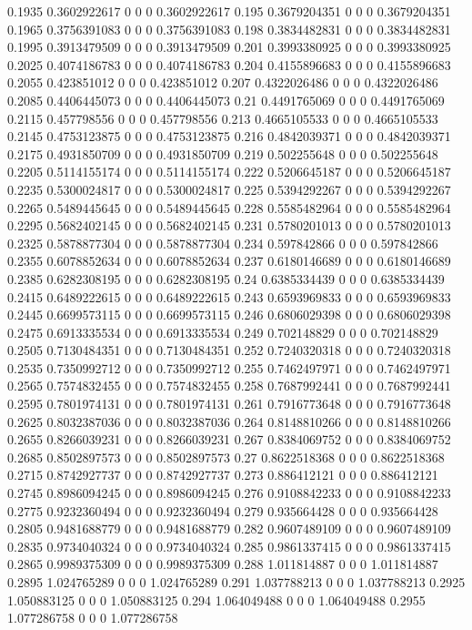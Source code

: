 {0.1935 0.3602922617 0 0 0 0.3602922617
0.195 0.3679204351 0 0 0 0.3679204351
0.1965 0.3756391083 0 0 0 0.3756391083
0.198 0.3834482831 0 0 0 0.3834482831
0.1995 0.3913479509 0 0 0 0.3913479509
0.201 0.3993380925 0 0 0 0.3993380925
0.2025 0.4074186783 0 0 0 0.4074186783
0.204 0.4155896683 0 0 0 0.4155896683
0.2055 0.423851012 0 0 0 0.423851012
0.207 0.4322026486 0 0 0 0.4322026486
0.2085 0.4406445073 0 0 0 0.4406445073
0.21 0.4491765069 0 0 0 0.4491765069
0.2115 0.457798556 0 0 0 0.457798556
0.213 0.4665105533 0 0 0 0.4665105533
0.2145 0.4753123875 0 0 0 0.4753123875
0.216 0.4842039371 0 0 0 0.4842039371
0.2175 0.4931850709 0 0 0 0.4931850709
0.219 0.502255648 0 0 0 0.502255648
0.2205 0.5114155174 0 0 0 0.5114155174
0.222 0.5206645187 0 0 0 0.5206645187
0.2235 0.5300024817 0 0 0 0.5300024817
0.225 0.5394292267 0 0 0 0.5394292267
0.2265 0.5489445645 0 0 0 0.5489445645
0.228 0.5585482964 0 0 0 0.5585482964
0.2295 0.5682402145 0 0 0 0.5682402145
0.231 0.5780201013 0 0 0 0.5780201013
0.2325 0.5878877304 0 0 0 0.5878877304
0.234 0.597842866 0 0 0 0.597842866
0.2355 0.6078852634 0 0 0 0.6078852634
0.237 0.6180146689 0 0 0 0.6180146689
0.2385 0.6282308195 0 0 0 0.6282308195
0.24 0.6385334439 0 0 0 0.6385334439
0.2415 0.6489222615 0 0 0 0.6489222615
0.243 0.6593969833 0 0 0 0.6593969833
0.2445 0.6699573115 0 0 0 0.6699573115
0.246 0.6806029398 0 0 0 0.6806029398
0.2475 0.6913335534 0 0 0 0.6913335534
0.249 0.702148829 0 0 0 0.702148829
0.2505 0.7130484351 0 0 0 0.7130484351
0.252 0.7240320318 0 0 0 0.7240320318
0.2535 0.7350992712 0 0 0 0.7350992712
0.255 0.7462497971 0 0 0 0.7462497971
0.2565 0.7574832455 0 0 0 0.7574832455
0.258 0.7687992441 0 0 0 0.7687992441
0.2595 0.7801974131 0 0 0 0.7801974131
0.261 0.7916773648 0 0 0 0.7916773648
0.2625 0.8032387036 0 0 0 0.8032387036
0.264 0.8148810266 0 0 0 0.8148810266
0.2655 0.8266039231 0 0 0 0.8266039231
0.267 0.8384069752 0 0 0 0.8384069752
0.2685 0.8502897573 0 0 0 0.8502897573
0.27 0.8622518368 0 0 0 0.8622518368
0.2715 0.8742927737 0 0 0 0.8742927737
0.273 0.886412121 0 0 0 0.886412121
0.2745 0.8986094245 0 0 0 0.8986094245
0.276 0.9108842233 0 0 0 0.9108842233
0.2775 0.9232360494 0 0 0 0.9232360494
0.279 0.935664428 0 0 0 0.935664428
0.2805 0.9481688779 0 0 0 0.9481688779
0.282 0.9607489109 0 0 0 0.9607489109
0.2835 0.9734040324 0 0 0 0.9734040324
0.285 0.9861337415 0 0 0 0.9861337415
0.2865 0.9989375309 0 0 0 0.9989375309
0.288 1.011814887 0 0 0 1.011814887
0.2895 1.024765289 0 0 0 1.024765289
0.291 1.037788213 0 0 0 1.037788213
0.2925 1.050883125 0 0 0 1.050883125
0.294 1.064049488 0 0 0 1.064049488
0.2955 1.077286758 0 0 0 1.077286758
}

